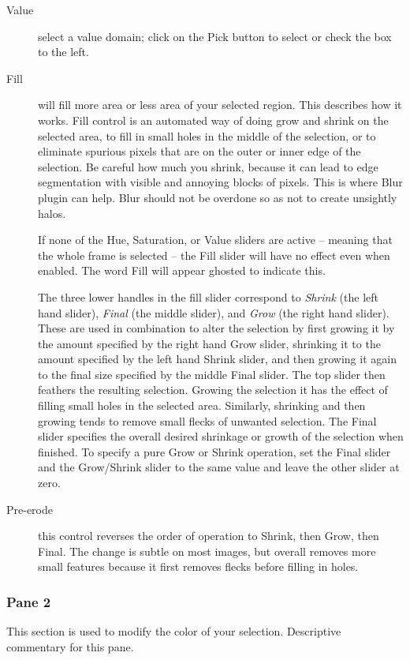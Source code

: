 \begin{description}
    \item[Value] select a value domain; click on the Pick button to select or check the box to the left.
    \item[Fill] will fill more area or less area of your selected region. This describes how it works. Fill control is an automated way of doing grow and shrink on the selected area, to fill in small holes in the middle of the selection, or to eliminate spurious pixels that are on the outer or inner edge of the selection.  Be careful how much you shrink, because it can lead to edge segmentation with visible and annoying blocks of pixels. This is where Blur plugin can help. Blur should not be overdone so as not to create unsightly halos.
   
    If none of the Hue, Saturation, or Value sliders are active -- meaning that the whole frame is selected -- the Fill slider will have no effect even when enabled. The word Fill will appear ghosted to indicate this.

    The three lower handles in the fill slider correspond to \textit{Shrink} (the left hand slider), \textit{Final} (the middle slider), and \textit{Grow} (the right hand slider). These are used in combination to alter the selection by first growing it by the amount specified by the right hand Grow slider, shrinking it to the amount specified by the left hand Shrink slider, and then growing it again to the final size specified by the middle Final slider. The top slider then feathers the resulting selection.
    Growing the selection it has the effect of filling small holes in the selected area. Similarly, shrinking and then growing tends to remove small flecks of unwanted selection. The Final slider specifies the overall desired shrinkage or growth of the selection when finished. To specify a pure Grow or Shrink operation, set the Final slider and the Grow/Shrink slider to the same value and leave the other slider at zero.
    \item[Pre-erode] this control reverses the order of operation to Shrink, then Grow, then Final. The change is subtle on most images, but overall removes more small features because it first removes flecks before filling in holes.
\end{description}

\subsubsection*{Pane 2}
\label{ssub:pane2}

This section is used to modify the color of your selection. Descriptive commentary for this pane.

